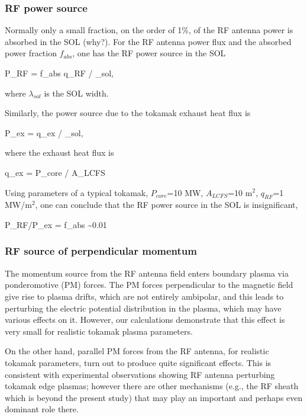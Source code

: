 \subsubsection{RF power source}

Normally only a small fraction, on the order of 1$\%$, of the RF
antenna power is absorbed in the SOL (why?). For the RF antenna power
flux and the absorbed power fraction $f_{abs}$, one has the RF power
source in the SOL

\beq
P_{RF} = f_{abs} q_{RF} / \lambda_{sol},
\eeq

where $\lambda_{sol}$ is the SOL width.

Similarly, the power source due to the tokamak exhaust heat flux is

\beq
P_{ex} = q_{ex}	/ \lambda_{sol},
\eeq

where the exhaust heat flux is

\beq
q_{ex} = P_{core} / A_{LCFS}
\eeq

Using parameters of a typical tokamak, $P_{core}$=10 MW, $A_{LCFS}$=10
m$^2$, $q_{RF}$=1 MW/m$^2$, one can conclude that the RF power source
in the SOL is insignificant,

\beq
P_{RF}/P_{ex} = f_{abs} \sim 0.01
\eeq


\subsubsection{RF source of perpendicular momentum}

The momentum source from the RF antenna field enters boundary plasma
via ponderomotive (PM) forces. The PM forces perpendicular to the
magnetic field give rise to plasma drifts, which are not entirely
ambipolar, and this leads to perturbing the electric potential
distribution in the plasma, which may have various effects on
it. However, our calculations demonstrate that this effect is very
small for realistic tokamak plasma parameters.

On the other hand, parallel PM forces from the RF antenna, for
realistic tokamak parameters, turn out to produce quite significant
effects. This is consistent with experimental observations showing RF
antenna perturbing tokamak edge plasmas; however there are other
mechanisms (e.g., the RF sheath \cite{} which is beyond the present
study) that may play an important and perhaps even dominant role
there.

